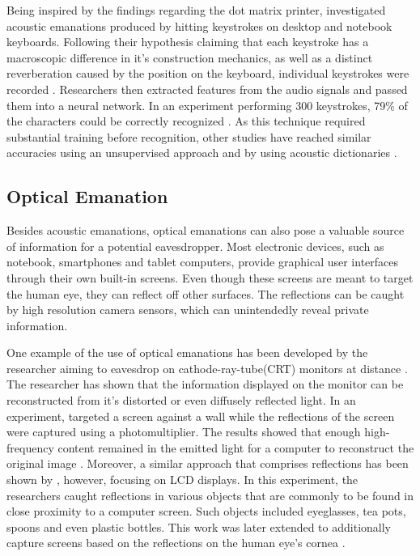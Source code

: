 Being inspired by the findings regarding the dot matrix printer, \citeauthor{1301311} investigated acoustic emanations produced by hitting keystrokes on desktop and notebook keyboards. Following their hypothesis claiming that each keystroke has a macroscopic difference in it's construction mechanics, as well as a distinct reverberation caused by the position on the keyboard, individual keystrokes were recorded \cite{1301311}. Researchers then extracted features from the audio signals and passed them into a neural network. In an experiment performing 300 keystrokes, 79\% of the characters could be correctly recognized \cite{1301311}. As this technique required substantial training before recognition, other studies have reached similar accuracies using an unsupervised approach \cite{Zhuang:2009:KAE:1609956.1609959} and by using acoustic dictionaries \cite{Berger:2006:DAU:1180405.1180436}.

\subsection{Optical Emanation}
Besides acoustic emanations, optical emanations can also pose a valuable source of information for a potential eavesdropper. Most electronic devices, such as notebook, smartphones and tablet computers, provide graphical user interfaces through their own built-in screens. Even though these screens are meant to target the human eye, they can reflect off other surfaces. The reflections can be caught by high resolution camera sensors, which can unintendedly reveal private information.

One example of the use of optical emanations has been developed by the researcher \citeauthor{1004358} aiming to eavesdrop on cathode-ray-tube(CRT) monitors at distance \cite{1004358}. The researcher has shown that the information displayed on the monitor can be reconstructed from it's distorted or even diffusely reflected light. In an experiment, \citeauthor{1004358} targeted a screen against a wall while the reflections of the screen were captured using a photomultiplier. The results showed that enough high-frequency content remained in the emitted light for a computer to reconstruct the original image \cite{1004358}. Moreover, a similar approach that comprises reflections has been shown by \citeauthor{4531151}, however, focusing on LCD displays. In this experiment, the researchers caught reflections in various objects that are commonly to be found in close proximity to a computer screen. Such objects included eyeglasses, tea pots, spoons and even plastic bottles. This work was later extended to additionally capture screens based on the reflections on the human eye's cornea \cite{5207653}.

